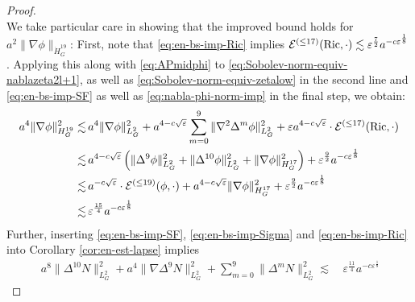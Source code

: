 \documentclass[11pt,leqno,textwidth=10cm]{amsart}
\numberwithin{equation}{section}
\theoremstyle{definition}
\theoremstyle{plain}
\newcommand{\1}{\mathbbm{1}}
\newcommand{\E}{\mathcal{E}}
\newcommand{\Ric}{\text{\normalfont{Ric}}}
\renewcommand{\epsilon}{\varepsilon}
\newcommand{\Lap}{\Delta}
\newcommand{\todo}[1]{\textcolor{red}{#1}}
\newcommand{\change}[1]{\color{black}#1\color{black}}
\begin{document}
\begin{proof}
{\begin{equation}
\end{equation}}
We take particular care in showing that the improved bound holds for $a^2\|\nabla\phi\|_{\dot{H}^{19}_G}$: First, note that \eqref{eq:en-bs-imp-Ric} \change{implies }$\E^{(\leq 17)}(\Ric,\cdot)\lesssim\epsilon^\frac72 a^{-c\epsilon^\frac18}$. Applying this along with \eqref{eq:APmidphi} to \eqref{eq:Sobolev-norm-equiv-nablazeta2l+1}, as well as \eqref{eq:Sobolev-norm-equiv-zetalow} in the second line and \change{\eqref{eq:en-bs-imp-SF} as well as \eqref{eq:nabla-phi-norm-imp} }in the final step, we obtain:
\begin{align*}
a^4\|\nabla\phi\|_{H^{19}_G}^2\lesssim&\, a^4\|\nabla\phi\|_{L^2_G}^2+a^{4-c\sqrt{\epsilon}}\sum_{m=0}^9\|\nabla^2\Lap^m\phi\|_{L^2_G}^2+\epsilon a^{4-c\sqrt{\epsilon}}\cdot \E^{(\leq 17)}(\Ric,\cdot)\\
\lesssim&\,a^{4-c\sqrt{\epsilon}}\left(\|\Lap^{9}\phi\|_{L^2_G}^2+\|\Lap^{10}\phi\|_{L^2_G}^2+\|\nabla\phi\|_{H^{17}_G}^2\right)+\epsilon^\frac{9}2a^{-c\epsilon^\frac18}\\
\lesssim&\,a^{-c\sqrt{\epsilon}}\cdot \E^{(\leq 19)}(\phi,\cdot)+a^{4-c\sqrt{\epsilon}}\|\nabla\phi\|_{H^{17}_G}^2+\epsilon^\frac{9}2a^{-c\epsilon^\frac18}\\
\lesssim&\,\epsilon^\frac{15}4 a^{-c\epsilon^\frac18}
\end{align*}
Further, inserting \eqref{eq:en-bs-imp-SF}, \eqref{eq:en-bs-imp-Sigma} and \eqref{eq:en-bs-imp-Ric} into Corollary \ref{cor:en-est-lapse} implies
\begin{align*}
\,a^8\|\Lap^{10} N\|^2_{L^2_G}+a^4\|\nabla\Lap^{9}N\|^2_{L^2_G}+\sum_{m=0}^{9}\|\Lap^mN\|_{L^2_G}^2%
\lesssim&\,\epsilon^\frac{11}4a^{-c\epsilon^\frac18}
\end{align*}

\end{proof}
\end{document}
